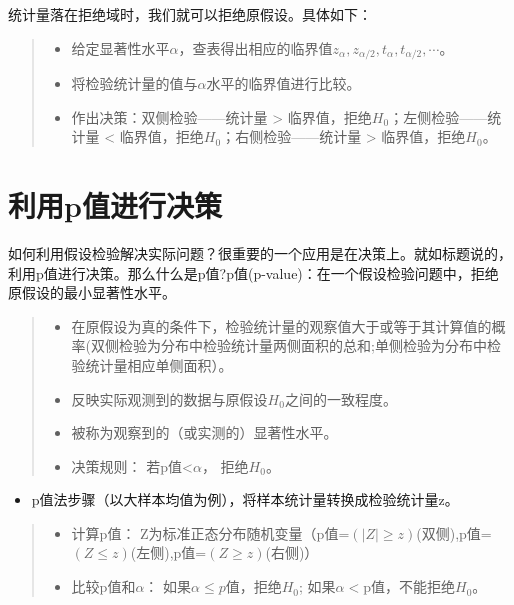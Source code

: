 \documentclass[]{ctexbook}
\providecommand{\tightlist}{%
  \setlength{\itemsep}{0pt}\setlength{\parskip}{0pt}}
\begin{document}
统计量落在拒绝域时，我们就可以拒绝原假设。具体如下：

\begin{quote}
\begin{itemize}
\tightlist
\item
  给定显著性水平\(\alpha\)，查表得出相应的临界值\(z_{\alpha},z_{\alpha/2},t_{\alpha},t_{\alpha/2},\cdots\)。
\item
  将检验统计量的值与\(\alpha\)水平的临界值进行比较。
\item
  作出决策：双侧检验------\textbar 统计量\textbar{} \textgreater{} 临界值，拒绝\(H_0\)；左侧检验------统计量 \textless{} 临界值，拒绝\(H_0\)；右侧检验------统计量 \textgreater{} 临界值，拒绝\(H_0\)。
\end{itemize}
\end{quote}

\hypertarget{ux5229ux7528pux503cux8fdbux884cux51b3ux7b56}{%
\section{利用p值进行决策}\label{ux5229ux7528pux503cux8fdbux884cux51b3ux7b56}}

如何利用假设检验解决实际问题？很重要的一个应用是在决策上。就如标题说的，利用p值进行决策。那么什么是p值?p值(p-value)：在一个假设检验问题中，拒绝原假设的最小显著性水平。

\begin{quote}
\begin{itemize}
\tightlist
\item
  在原假设为真的条件下，检验统计量的观察值大于或等于其计算值的概率(双侧检验为分布中检验统计量两侧面积的总和;单侧检验为分布中检验统计量相应单侧面积）。
\item
  反映实际观测到的数据与原假设\(H_0\)之间的一致程度。
\item
  被称为观察到的（或实测的）显著性水平。
\item
  决策规则： 若p值\textless{}\(\alpha\)， 拒绝\(H_0\)。
\end{itemize}
\end{quote}

\begin{itemize}
\tightlist
\item
  p值法步骤（以大样本均值为例），将样本统计量转换成检验统计量z。
\end{itemize}

\begin{quote}
\begin{itemize}
\tightlist
\item
  计算p值： Z为标准正态分布随机变量（p值=\((\left|Z\right|\ge z)\)(双侧),p值=\((Z\le z)\)(左侧),p值=\((Z\ge z)\)(右侧)）
\item
  比较p值和\(\alpha\)：
  如果\(\alpha \leq p\)值，拒绝\(H_0\);
  如果\(\alpha<\)p值，不能拒绝\(H_0\)。
\end{itemize}
\end{quote}
\end{document}
